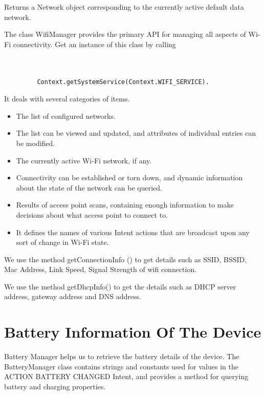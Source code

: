 \documentclass[12pt]{report}
\begin{document}
Returns a Network object corresponding to the currently active default data network. 

The class WifiManager provides the primary API for managing all aspects of Wi-Fi connectivity. Get an instance of this class by calling
\begin{lstlisting}


         Context.getSystemService(Context.WIFI_SERVICE). 
         \end{lstlisting}
         It deals with several categories of items.
\begin{itemize}

	\item The list of configured networks. 
	\item The list can be viewed and updated, and attributes of individual entries can be modified.
    \item The currently active Wi-Fi network, if any. 
    \item Connectivity can be established or torn down, and dynamic information about the state of the network can be queried.
    \item Results of access point scans, containing enough information to make decisions about what access point to connect to.
    \item It defines the names of various Intent actions that are broadcast upon any sort of change in Wi-Fi state. 
    \end{itemize}

We use the method getConnectionInfo () to get details such as SSID, BSSID, Mac Address, Link Speed, Signal Strength of wifi connection.

We use the method getDhcpInfo() to get the details such as DHCP server address, gateway address and DNS address.


\section{Battery Information Of The Device}

Battery Manager helps us to retrieve the battery details of the device. The BatteryManager class contains strings and constants used for values in the ACTION BATTERY CHANGED Intent, and provides a method for querying battery and charging properties. 
\end{document}
